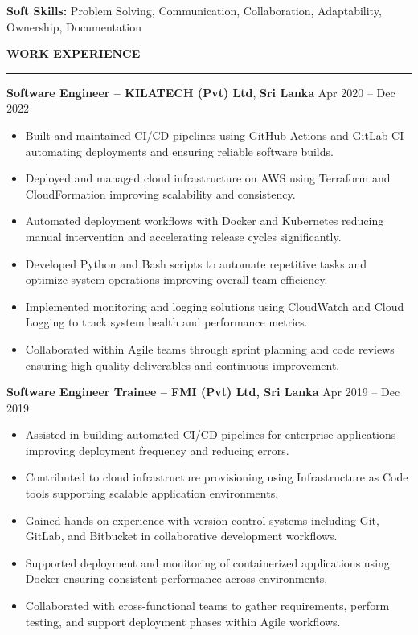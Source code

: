 \documentclass[10pt,letterpaper]{article}
\begin{document}
\textbf{Soft Skills:} Problem Solving, Communication, Collaboration, Adaptability, Ownership, Documentation

\vspace{8pt}

\textbf{WORK EXPERIENCE}\\[-8pt]
\noindent\rule{\textwidth}{1pt}

\vspace{-2pt}

\textbf{Software Engineer -- KILATECH (Pvt) Ltd}, \textbf{Sri Lanka} \hfill Apr 2020 -- Dec 2022

\vspace{-1pt}

\begin{itemize}
\item Built and maintained CI/CD pipelines using GitHub Actions and GitLab CI automating deployments and ensuring reliable software builds.
\item Deployed and managed cloud infrastructure on AWS using Terraform and CloudFormation improving scalability and consistency.
\item Automated deployment workflows with Docker and Kubernetes reducing manual intervention and accelerating release cycles significantly.
\item Developed Python and Bash scripts to automate repetitive tasks and optimize system operations improving overall team efficiency.
\item Implemented monitoring and logging solutions using CloudWatch and Cloud Logging to track system health and performance metrics.
\item Collaborated within Agile teams through sprint planning and code reviews ensuring high-quality deliverables and continuous improvement.
\end{itemize}

\textbf{Software Engineer Trainee -- FMI (Pvt) Ltd, Sri Lanka} \hfill Apr 2019 -- Dec 2019

\vspace{-1pt}

\begin{itemize}
\item Assisted in building automated CI/CD pipelines for enterprise applications improving deployment frequency and reducing errors.
\item Contributed to cloud infrastructure provisioning using Infrastructure as Code tools supporting scalable application environments.
\item Gained hands-on experience with version control systems including Git, GitLab, and Bitbucket in collaborative development workflows.
\item Supported deployment and monitoring of containerized applications using Docker ensuring consistent performance across environments.
\item Collaborated with cross-functional teams to gather requirements, perform testing, and support deployment phases within Agile workflows.
\end{itemize}
\end{document}
